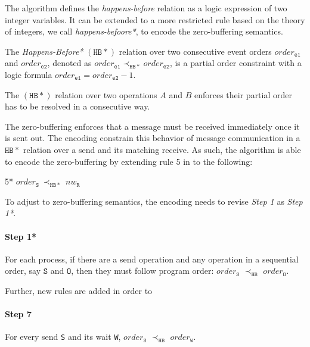 The algorithm defines the \textit{happens-before} relation as a logic expression of two integer variables. It can be extended to a more restricted rule based on the theory of integers, we call \textit{happens-befoore*}, to encode the zero-buffering semantics. 

\begin{definition}
The \emph{Happens-Before*} $(\mathtt{HB*})$ relation over two consecutive event orders $\mathit{order}_\mathtt{e1}$ and $\mathit{order}_\mathtt{e2}$, denoted as
$\mathit{order}_\mathtt{e1} \mathrm{\prec_\mathtt{HB*}} \mathit{order}_\mathtt{e2}$, is a partial order constraint with a logic formula $\mathit{order}_\mathtt{e1} =  \mathit{order}_\mathtt{e2} - 1$.
\label{def:hb*}
\end{definition}

The $(\mathtt{HB*})$ relation over two operations $A$ and $B$ enforces their partial order has to be resolved in a consecutive way. 

The zero-buffering enforces that a message must be received immediately once it is sent out. The encoding constrain this behavior of message communication in a $\mathtt{HB*}$ relation over a send and its matching receive. As such, the algorithm is able to encode the zero-buffering by extending rule 5 in  to the following:
\begin{compactenum}
\item[5*] $\mathit{order}_{\mathtt{S}}\ \mathrm{\prec_\mathtt{HB*}}\ \mathit{nw}_{\mathtt{R}}$
\end{compactenum}

To adjust to zero-buffering semantics, the encoding needs to revise \emph{Step 1} as \emph{Step 1*}.

\paragraph*{Step 1*} For each process, if there are a send operation and any operation in a sequential order, say $\mathtt{S}$ and $\mathtt{O}$, then 
they must follow program order: $\mathit{order}_\mathtt{S}$
$\prec_\mathtt{HB}$ $\mathit{order}_\mathtt{O}$. 

Further, new rules are added in order to 

\paragraph*{Step 7} For every send \texttt{S} and its wait \texttt{W}, $\mathit{order}_\mathtt{S}$
$\prec_\mathtt{HB}$ $\mathit{order}_\mathtt{W}$.

